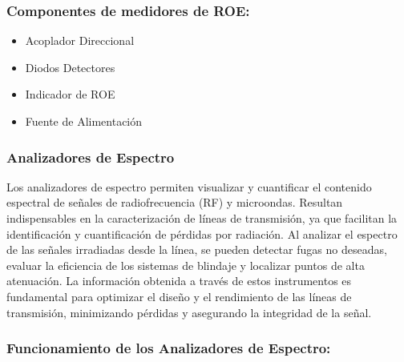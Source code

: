         \subsubsection*{Componentes de medidores de ROE:}

            \begin{itemize}
                \item Acoplador Direccional
                \item Diodos Detectores
                \item Indicador de ROE
                \item Fuente de Alimentación
            \end{itemize}

        \subsubsection{Analizadores de Espectro}

            Los analizadores de espectro permiten visualizar y cuantificar el contenido espectral de señales de radiofrecuencia (RF) y microondas. Resultan indispensables en la caracterización de líneas de transmisión, ya que facilitan la identificación y cuantificación de pérdidas por radiación. Al analizar el espectro de las señales irradiadas desde la línea, se pueden detectar fugas no deseadas, evaluar la eficiencia de los sistemas de blindaje y localizar puntos de alta atenuación. La información obtenida a través de estos instrumentos es fundamental para optimizar el diseño y el rendimiento de las líneas de transmisión, minimizando pérdidas y asegurando la integridad de la señal.

        \subsubsection*{Funcionamiento de los Analizadores de Espectro:}
            
